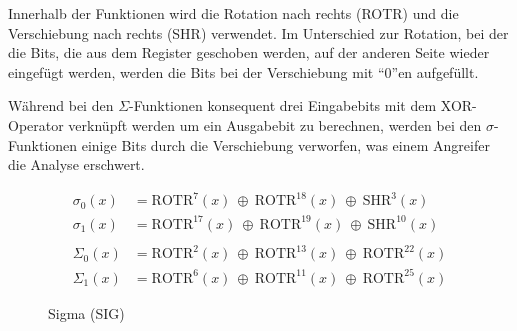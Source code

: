 Innerhalb der Funktionen wird die Rotation nach rechts (ROTR) und die Verschiebung nach rechts (SHR) verwendet. Im Unterschied zur Rotation, bei der die Bits,
die aus dem Register geschoben werden, auf der anderen Seite wieder eingefügt werden, werden die Bits bei der Verschiebung mit "`$0$"'en aufgefüllt.

Während bei den $\Sigma$-Funktionen konsequent drei Eingabebits mit dem XOR-Operator verknüpft werden um ein Ausgabebit zu berechnen, werden bei den $\sigma$-Funktionen
einige Bits durch die Verschiebung verworfen, was einem Angreifer die Analyse erschwert.

\begin{figure}[!h]
  \begin{align}
  \sigma_0(x) &= \text{ROTR}^{7}(x)~\oplus~\text{ROTR}^{18}(x)~\oplus~\text{SHR}^{3}(x) \nonumber\\
  \sigma_1(x) &= \text{ROTR}^{17}(x)~\oplus~\text{ROTR}^{19}(x)~\oplus~\text{SHR}^{10}(x) \nonumber\\
  \nonumber\\
  \Sigma_0(x) &= \text{ROTR}^{2}(x)~\oplus~\text{ROTR}^{13}(x)~\oplus~\text{ROTR}^{22}(x) \nonumber\\
  \Sigma_1(x) &= \text{ROTR}^{6}(x)~\oplus~\text{ROTR}^{11}(x)~\oplus~\text{ROTR}^{25}(x) \nonumber
  \end{align}
  \caption{Sigma (SIG)}
  \label{eq:sig}
\end{figure}